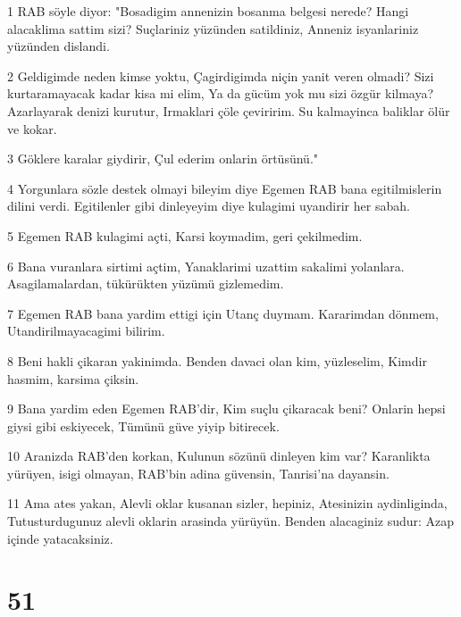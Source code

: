 \par 1 RAB söyle diyor: "Bosadigim annenizin bosanma belgesi nerede? Hangi alacaklima sattim sizi? Suçlariniz yüzünden satildiniz, Anneniz isyanlariniz yüzünden dislandi.
\par 2 Geldigimde neden kimse yoktu, Çagirdigimda niçin yanit veren olmadi? Sizi kurtaramayacak kadar kisa mi elim, Ya da gücüm yok mu sizi özgür kilmaya? Azarlayarak denizi kurutur, Irmaklari çöle çeviririm. Su kalmayinca baliklar ölür ve kokar.
\par 3 Göklere karalar giydirir, Çul ederim onlarin örtüsünü."
\par 4 Yorgunlara sözle destek olmayi bileyim diye Egemen RAB bana egitilmislerin dilini verdi. Egitilenler gibi dinleyeyim diye kulagimi uyandirir her sabah.
\par 5 Egemen RAB kulagimi açti, Karsi koymadim, geri çekilmedim.
\par 6 Bana vuranlara sirtimi açtim, Yanaklarimi uzattim sakalimi yolanlara. Asagilamalardan, tükürükten yüzümü gizlemedim.
\par 7 Egemen RAB bana yardim ettigi için Utanç duymam. Kararimdan dönmem, Utandirilmayacagimi bilirim.
\par 8 Beni hakli çikaran yakinimda. Benden davaci olan kim, yüzleselim, Kimdir hasmim, karsima çiksin.
\par 9 Bana yardim eden Egemen RAB'dir, Kim suçlu çikaracak beni? Onlarin hepsi giysi gibi eskiyecek, Tümünü güve yiyip bitirecek.
\par 10 Aranizda RAB'den korkan, Kulunun sözünü dinleyen kim var? Karanlikta yürüyen, isigi olmayan, RAB'bin adina güvensin, Tanrisi'na dayansin.
\par 11 Ama ates yakan, Alevli oklar kusanan sizler, hepiniz, Atesinizin aydinliginda, Tutusturdugunuz alevli oklarin arasinda yürüyün. Benden alacaginiz sudur: Azap içinde yatacaksiniz.

\chapter{51}

